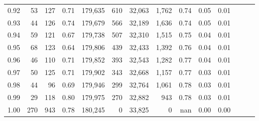 \begin{tabular}{rrrrrrrrrrrrrr}
0.92 &      53 &  127 &  0.71 &  179,635 &      610 &  32,063 &   1,762 &  0.74 &  0.05 &      0.01 \\
0.93 &      44 &  126 &  0.74 &  179,679 &      566 &  32,189 &   1,636 &  0.74 &  0.05 &      0.01 \\
0.94 &      59 &  121 &  0.67 &  179,738 &      507 &  32,310 &   1,515 &  0.75 &  0.04 &      0.01 \\
0.95 &      68 &  123 &  0.64 &  179,806 &      439 &  32,433 &   1,392 &  0.76 &  0.04 &      0.01 \\
0.96 &      46 &  110 &  0.71 &  179,852 &      393 &  32,543 &   1,282 &  0.77 &  0.04 &      0.01 \\
0.97 &      50 &  125 &  0.71 &  179,902 &      343 &  32,668 &   1,157 &  0.77 &  0.03 &      0.01 \\
0.98 &      44 &   96 &  0.69 &  179,946 &      299 &  32,764 &   1,061 &  0.78 &  0.03 &      0.01 \\
0.99 &      29 &  118 &  0.80 &  179,975 &      270 &  32,882 &     943 &  0.78 &  0.03 &      0.01 \\
1.00 &     270 &  943 &  0.78 &  180,245 &        0 &  33,825 &       0 &   nan &  0.00 &      0.00 \\
\bottomrule
\end{tabular}
